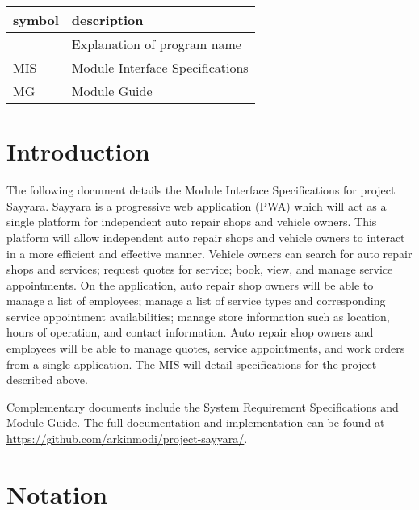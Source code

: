\documentclass[12pt, titlepage]{article}
\begin{document}
\begin{tabular}{l l}
	\toprule
	\textbf{symbol} & \textbf{description}            \\
	\midrule
	\progname       & Explanation of program name     \\
	MIS             & Module Interface Specifications \\
	MG              & Module Guide                    \\
	\bottomrule
\end{tabular}

\newpage

\tableofcontents

\newpage

\listoftables

\listoffigures

\newpage


\section{Introduction}

The following document details the Module Interface Specifications for project Sayyara. Sayyara is
a progressive web application (PWA) which will act as a single platform for independent auto repair
shops and vehicle owners. This platform will allow independent auto repair shops and vehicle owners
to interact in a more efficient and effective manner. Vehicle owners can search for auto repair
shops and services; request quotes for service; book, view, and manage service appointments. On the
application, auto repair shop owners will be able to manage a list of employees; manage a list of
service types and corresponding service appointment availabilities; manage store information such
as location, hours of operation, and contact information. Auto repair shop owners and employees
will be able to manage quotes, service appointments, and work orders from a single application. The
MIS will detail specifications for the project described above.

Complementary documents include the System Requirement Specifications and Module Guide. The full
documentation and implementation can be found at
\url{https://github.com/arkinmodi/project-sayyara/}.

\section{Notation}
\end{document}

